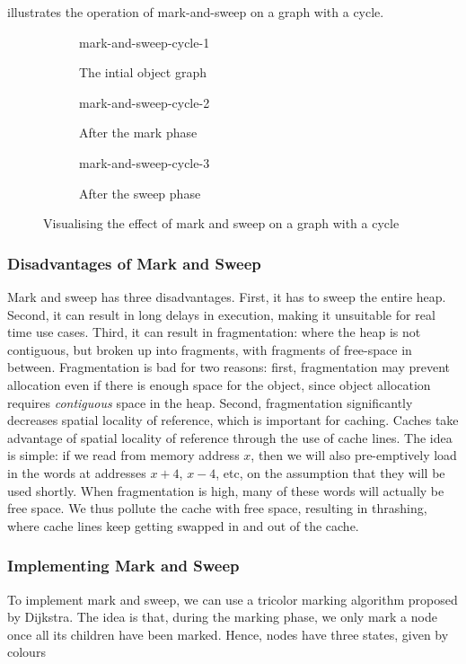 illustrates the operation of mark-and-sweep on a graph with a cycle.

\begin{figure}[H]
    \centering
    \begin{subfigure}{0.31\textwidth}
        {mark-and-sweep-cycle-1}
        \caption{The intial object graph}
        \label{fig:m&s-c-1}
    \end{subfigure}
    \begin{subfigure}{0.31\textwidth}
        {mark-and-sweep-cycle-2}
        \caption{After the mark phase}
        \label{fig:m&s-c-2}
    \end{subfigure}
    \begin{subfigure}{0.31\textwidth}
        {mark-and-sweep-cycle-3}
        \caption{After the sweep phase}
        \label{fig:m&s-c-3}
    \end{subfigure}
    \caption{Visualising the effect of mark and sweep on a graph with a cycle}
    \label{fig:mark-and-sweep-cyclic-example}
\end{figure}

\subsubsection{Disadvantages of Mark and Sweep}
Mark and sweep has three disadvantages. First, it has to sweep the entire heap. Second, it can result in long delays in execution, making it unsuitable for real time use cases. Third, it can result in fragmentation: where the heap is not contiguous, but broken up into fragments, with fragments of free-space in between. Fragmentation is bad for two reasons: first, fragmentation may prevent allocation even if there is enough space for the object, since object allocation requires \textit{contiguous} space in the heap. Second, fragmentation significantly decreases spatial locality of reference, which is important for caching. Caches take advantage of spatial locality of reference through the use of cache lines. The idea is simple: if we read from memory address $x$, then we will also pre-emptively load in the words at addresses $x+4$, $x-4$, etc, on the assumption that they will be used shortly. When fragmentation is high, many of these words will actually be free space. We thus pollute the cache with free space, resulting in thrashing, where cache lines keep getting swapped in and out of the cache.

\subsubsection{Implementing Mark and Sweep\optional}
To implement mark and sweep, we can use a tricolor marking algorithm proposed by Dijkstra. The idea is that, during the marking phase, we only mark a node once all its children have been marked. Hence, nodes have three states, given by colours

